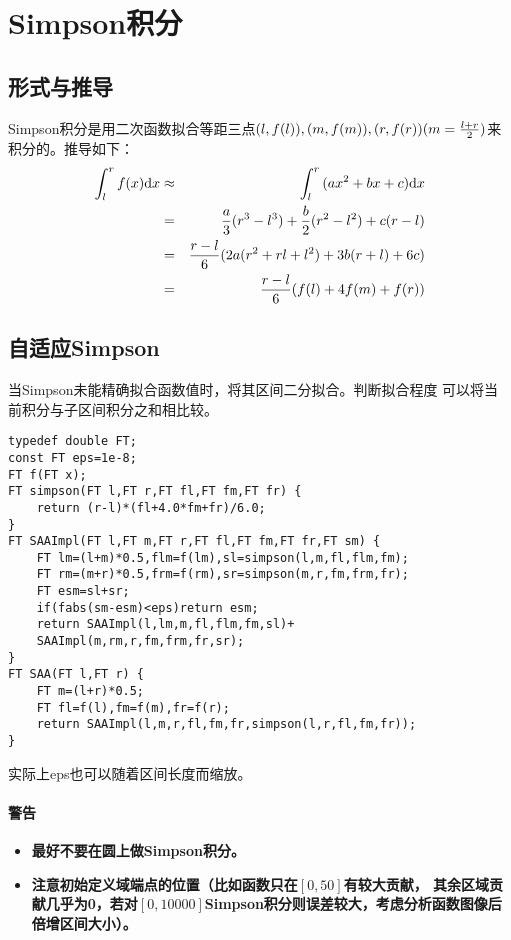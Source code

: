 \section{Simpson积分}
\subsection{形式与推导}
Simpson积分是用二次函数拟合等距三点$(l,f(l)),(m,f(m)),(r,f(r))\\
(m=\frac{l+r}{2})$来积分的。推导如下：
\begin{eqnarray*}
    \int_l^r{f(x)\textrm{d} x}&\approx&\int_l^r{(ax^2+bx+c)\textrm{d} x}\\
    &=&\frac{a}{3}(r^3-l^3)+\frac{b}{2}(r^2-l^2)+c(r-l)\\
    &=&\frac{r-l}{6}(2a(r^2+rl+l^2)+3b(r+l)+6c)\\
    &=&\frac{r-l}{6}(f(l)+4f(m)+f(r))
\end{eqnarray*}

\subsection{自适应Simpson}
当Simpson未能精确拟合函数值时，将其区间二分拟合。判断拟合程度
可以将当前积分与子区间积分之和相比较。

\begin{lstlisting}
typedef double FT;
const FT eps=1e-8;
FT f(FT x);
FT simpson(FT l,FT r,FT fl,FT fm,FT fr) {
    return (r-l)*(fl+4.0*fm+fr)/6.0;
}
FT SAAImpl(FT l,FT m,FT r,FT fl,FT fm,FT fr,FT sm) {
    FT lm=(l+m)*0.5,flm=f(lm),sl=simpson(l,m,fl,flm,fm);
    FT rm=(m+r)*0.5,frm=f(rm),sr=simpson(m,r,fm,frm,fr);
    FT esm=sl+sr;
    if(fabs(sm-esm)<eps)return esm;
    return SAAImpl(l,lm,m,fl,flm,fm,sl)+
    SAAImpl(m,rm,r,fm,frm,fr,sr);
}
FT SAA(FT l,FT r) {
    FT m=(l+r)*0.5;
    FT fl=f(l),fm=f(m),fr=f(r);
    return SAAImpl(l,m,r,fl,fm,fr,simpson(l,r,fl,fm,fr));
}
\end{lstlisting}

实际上eps也可以随着区间长度而缩放。

\paragraph{警告}
\begin{itemize}
    \item {\bfseries 最好不要在圆上做Simpson积分。}
    \item {\bfseries 注意初始定义域端点的位置（比如函数只在$[0,50]$有较大贡献，
其余区域贡献几乎为0，若对$[0,10000]$Simpson积分则误差较大，考虑分析函数图像后
倍增区间大小）。}
\end{itemize}
